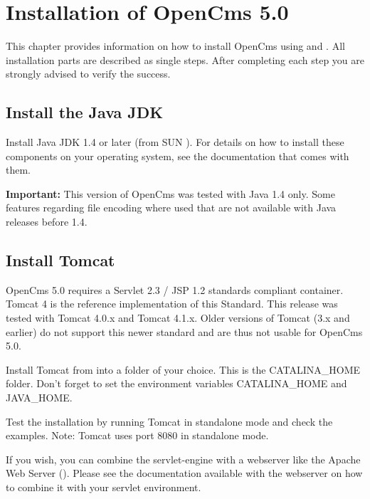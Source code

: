 \chapter{Installation of OpenCms 5.0}
\label{installation}

This chapter provides information on how to install OpenCms using
 and
. All installation parts are
described as single steps. After completing each step you are
strongly advised to verify the success.

\section{Install the Java JDK}
Install Java JDK 1.4 or later (from SUN
).
For details on how to install these components on your operating
system, see the documentation that comes with them.

\textbf{Important:} This version of OpenCms was tested with Java 1.4 only. 
Some features regarding file encoding where used that are not available with Java releases before 1.4.

\section{Install Tomcat}
OpenCms 5.0 requires a Servlet 2.3 / JSP 1.2 standards compliant container. 
Tomcat 4 is the reference implementation of this Standard. 
This release was tested with Tomcat 4.0.x and Tomcat 4.1.x. 
Older versions of Tomcat (3.x and earlier) do not support this newer standard and are thus not usable for OpenCms 5.0.

Install Tomcat from
into a folder of your choice. This is the CATALINA\_HOME folder.
Don't forget to set the environment variables CATALINA\_HOME and
JAVA\_HOME.

Test the installation by running Tomcat in standalone mode and
check the examples. Note: Tomcat uses port 8080 in standalone
mode.
 
If you wish, you can combine the servlet-engine with a webserver
like the Apache Web Server
().
Please see the documentation available with the webserver on how to combine it with your servlet environment.

